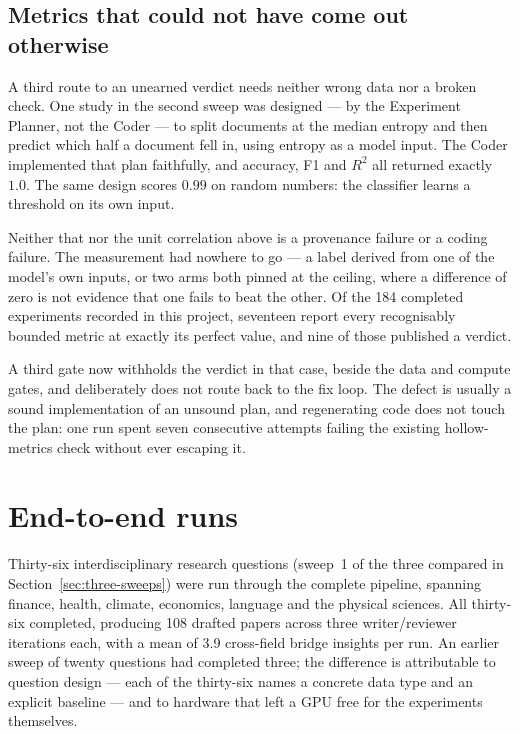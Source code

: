 \subsection{Metrics that could not have come out otherwise}
\label{sec:saturation}

A third route to an unearned verdict needs neither wrong data nor a broken check.
One study in the second sweep was designed --- by the Experiment Planner, not the
Coder --- to split documents at the median entropy and then predict which half a
document fell in, using entropy as a model input. The Coder implemented that plan
faithfully, and accuracy, F1 and $R^2$ all returned exactly $1.0$. The same design
scores $0.99$ on random numbers: the classifier learns a threshold on its own input.

Neither that nor the unit correlation above is a provenance failure or a coding
failure. The measurement had nowhere to go --- a label derived from one of the
model's own inputs, or two arms both pinned at the ceiling, where a difference of
zero is not evidence that one fails to beat the other. Of the 184 completed
experiments recorded in this project, seventeen report every recognisably bounded
metric at exactly its perfect value, and nine of those published a verdict.

A third gate now withholds the verdict in that case, beside the data and compute
gates, and deliberately does not route back to the fix loop. The defect is usually a
sound implementation of an unsound plan, and regenerating code does not touch the
plan: one run spent seven consecutive attempts failing the existing hollow-metrics
check without ever escaping it.

\section{End-to-end runs}
\label{sec:end-to-end}

Thirty-six interdisciplinary research questions (sweep~1 of the three compared in
Section~\ref{sec:three-sweeps}) were run through the complete
pipeline, spanning finance, health, climate, economics, language and the physical
sciences. All thirty-six completed, producing 108 drafted papers across three
writer/reviewer iterations each, with a mean of 3.9 cross-field bridge insights
per run. An earlier sweep of twenty questions had completed three; the difference
is attributable to question design --- each of the thirty-six names a concrete
data type and an explicit baseline --- and to hardware that left a GPU free for
the experiments themselves.

